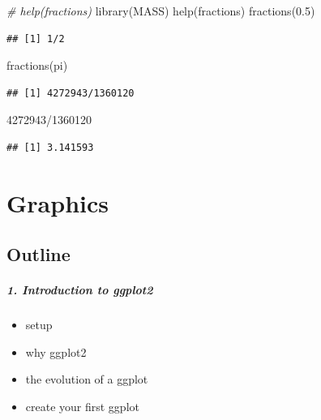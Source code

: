 \documentclass[
]{book}
\newenvironment{Shaded}{\begin{snugshade}}{\end{snugshade}}
\newcommand{\CommentTok}[1]{\textcolor[rgb]{0.56,0.35,0.01}{\textit{#1}}}
\newcommand{\DecValTok}[1]{\textcolor[rgb]{0.00,0.00,0.81}{#1}}
\newcommand{\FloatTok}[1]{\textcolor[rgb]{0.00,0.00,0.81}{#1}}
\newcommand{\FunctionTok}[1]{\textcolor[rgb]{0.00,0.00,0.00}{#1}}
\newcommand{\NormalTok}[1]{#1}
\newcommand{\SpecialCharTok}[1]{\textcolor[rgb]{0.00,0.00,0.00}{#1}}
\providecommand{\tightlist}{%
  \setlength{\itemsep}{0pt}\setlength{\parskip}{0pt}}
\begin{document}
\begin{Shaded}
\begin{Highlighting}[]
\CommentTok{\# help(fractions)}
\FunctionTok{library}\NormalTok{(MASS)}
\FunctionTok{help}\NormalTok{(fractions)}
\FunctionTok{fractions}\NormalTok{(}\FloatTok{0.5}\NormalTok{)}
\end{Highlighting}
\end{Shaded}

\begin{verbatim}
## [1] 1/2
\end{verbatim}

\begin{Shaded}
\begin{Highlighting}[]
\FunctionTok{fractions}\NormalTok{(pi)}
\end{Highlighting}
\end{Shaded}

\begin{verbatim}
## [1] 4272943/1360120
\end{verbatim}

\begin{Shaded}
\begin{Highlighting}[]
\DecValTok{4272943}\SpecialCharTok{/}\DecValTok{1360120}
\end{Highlighting}
\end{Shaded}

\begin{verbatim}
## [1] 3.141593
\end{verbatim}

\hypertarget{graphics}{%
\chapter{Graphics}\label{graphics}}

\hypertarget{outline}{%
\section*{Outline}\label{outline}}

\hypertarget{introduction-to-ggplot2}{%
\paragraph*{1. Introduction to ggplot2}\label{introduction-to-ggplot2}}

\begin{itemize}
\tightlist
\item
  setup
\item
  why ggplot2
\item
  the evolution of a ggplot
\item
  create your first ggplot
\end{itemize}
\end{document}
